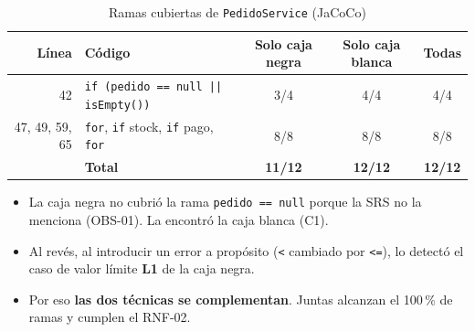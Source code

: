 \documentclass[11pt,a4paper,oneside]{report}
\newcommand{\code}[1]{\texttt{#1}}
\begin{document}
\begin{table}[H]
\centering
\caption{Ramas cubiertas de \code{PedidoService} (JaCoCo)}
\small
\begin{tabular}{rlccc}
\toprule
\textbf{Línea} & \textbf{Código} & \textbf{Solo caja negra} & \textbf{Solo caja blanca} & \textbf{Todas}\\
\midrule
42 & \code{if (pedido == null || isEmpty())} & \textcolor{anot}{3/4} & 4/4 & 4/4\\
47, 49, 59, 65 & \code{for}, \code{if} stock, \code{if} pago, \code{for} & 8/8 & 8/8 & 8/8\\
\midrule
& \textbf{Total} & \textbf{11/12} & \textbf{12/12} & \textbf{12/12}\\
\bottomrule
\end{tabular}
\end{table}

\begin{idea}[Hallazgos]
\begin{itemize}
  \item La caja negra no cubrió la rama \code{pedido == null} porque la SRS no la menciona (OBS-01). La encontró la caja blanca (C1).
  \item Al revés, al introducir un error a propósito (\code{<} cambiado por \code{<=}), lo detectó el caso de valor límite \textbf{L1} de la caja negra.
  \item Por eso \textbf{las dos técnicas se complementan}. Juntas alcanzan el 100\,\% de ramas y cumplen el RNF-02.
\end{itemize}
\end{idea}

\end{document}
